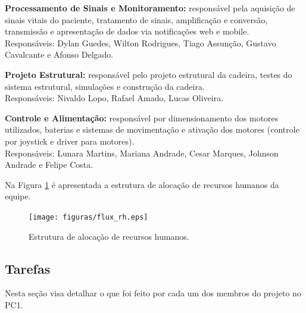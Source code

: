 \textbf{Processamento de Sinais e Monitoramento:} responsável pela aquisição de sinais vitais do paciente,
tratamento de sinais, amplificação e conversão, transmissão e apresentação de
dados via notificações web e mobile.
\\Responsáveis: Dylan Guedes, Wilton Rodrigues, Tiago Assunção, Gustavo Cavalcante e Afonso Delgado.

\textbf{Projeto Estrutural:} responsável pelo projeto estrutural da cadeira, testes
do sistema estrutural, simulações e construção da cadeira.
\\Responsáveis: Nivaldo Lopo, Rafael Amado, Lucas Oliveira.

\textbf{Controle e Alimentação:} responsável por dimensionamento dos motores utilizados,
baterias e sistemas de movimentação e ativação dos motores (controle por
joystick e driver para motores).
\\Responsáveis: Lunara Martins, Mariana Andrade, Cesar Marques, Johnson Andrade e Felipe Costa.

Na Figura \ref{flux_rh} é apresentada a estrutura de alocação de recursos humanos da equipe.


\begin{figure}[h]
    \centering
    \label{flux_rh}
    \texttt{[image: figuras/flux\_rh.eps]}
    \caption{Estrutura de alocação de recursos humanos.}
\end{figure}

\subsection{Tarefas}

Nesta seção visa detalhar o que foi feito por cada um dos membros do projeto no PC1.

